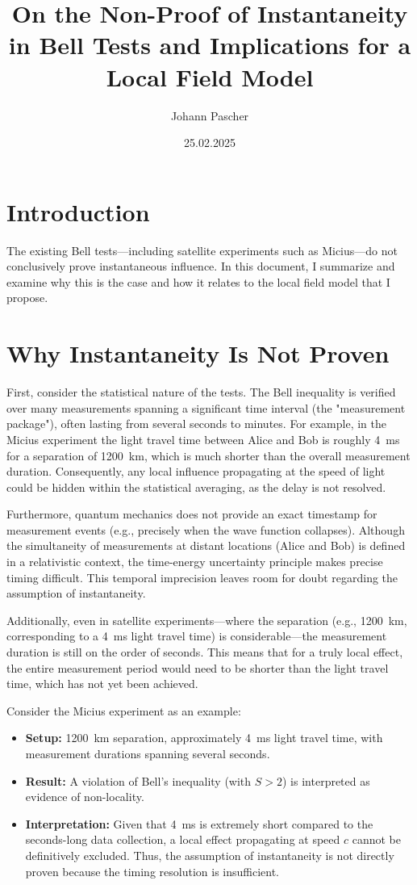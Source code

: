 \documentclass[12pt,landscape]{article}
\title{On the Non-Proof of Instantaneity in Bell Tests and Implications for a Local Field Model}
\author{Johann Pascher}
\date{25.02.2025}
\begin{document}
	\maketitle
	
	\section*{Introduction}
	The existing Bell tests—including satellite experiments such as Micius—do not conclusively prove instantaneous influence. In this document, I summarize and examine why this is the case and how it relates to the local field model that I propose.
	
	\section*{Why Instantaneity Is Not Proven}
	First, consider the statistical nature of the tests. The Bell inequality is verified over many measurements spanning a significant time interval (the "measurement package"), often lasting from several seconds to minutes. For example, in the Micius experiment the light travel time between Alice and Bob is roughly 4~ms for a separation of 1200~km, which is much shorter than the overall measurement duration. Consequently, any local influence propagating at the speed of light could be hidden within the statistical averaging, as the delay is not resolved.
	
	Furthermore, quantum mechanics does not provide an exact timestamp for measurement events (e.g., precisely when the wave function collapses). Although the simultaneity of measurements at distant locations (Alice and Bob) is defined in a relativistic context, the time-energy uncertainty principle makes precise timing difficult. This temporal imprecision leaves room for doubt regarding the assumption of instantaneity.
	
	Additionally, even in satellite experiments—where the separation (e.g., 1200~km, corresponding to a 4~ms light travel time) is considerable—the measurement duration is still on the order of seconds. This means that for a truly local effect, the entire measurement period would need to be shorter than the light travel time, which has not yet been achieved.
	
	Consider the Micius experiment as an example:
	\begin{itemize}
		\item \textbf{Setup:} 1200~km separation, approximately 4~ms light travel time, with measurement durations spanning several seconds.
		\item \textbf{Result:} A violation of Bell's inequality (with $S>2$) is interpreted as evidence of non-locality.
		\item \textbf{Interpretation:} Given that 4~ms is extremely short compared to the seconds-long data collection, a local effect propagating at speed $c$ cannot be definitively excluded. Thus, the assumption of instantaneity is not directly proven because the timing resolution is insufficient.
	\end{itemize}
	
\end{document}
